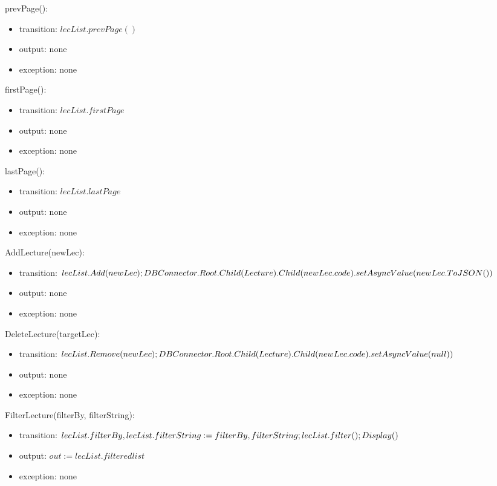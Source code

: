 \documentclass[12pt, titlepage]{article}
\begin{document}
\noindent prevPage():
\begin{itemize}
\item transition: $lecList.prevPage()$
\item output: none
\item exception: none
\end{itemize}

\noindent firstPage():
\begin{itemize}
\item transition: $lecList.firstPage$
\item output: none
\item exception: none
\end{itemize}

\noindent lastPage():
\begin{itemize}
\item transition: $lecList.lastPage$
\item output: none
\item exception: none
\end{itemize}

\noindent AddLecture(newLec):
\begin{itemize}
\item transition: $lecList.Add(newLec);\\DBConnector.Root.Child(Lecture).Child(newLec.code).setAsyncValue(newLec.ToJSON())$
\item output: none
\item exception: none
\end{itemize}

\noindent DeleteLecture(targetLec):
\begin{itemize}
\item transition: $lecList.Remove(newLec);\\DBConnector.Root.Child(Lecture).Child(newLec.code).setAsyncValue(null))$
\item output: none
\item exception: none
\end{itemize}

\noindent FilterLecture(filterBy, filterString):
\begin{itemize}
\item transition: $lecList.filterBy, lecList.filterString := filterBy, filterString;\\lecList.filter(); Display()$
\item output: $out := lecList.filteredlist$
\item exception: none
\end{itemize}
\end{document}
